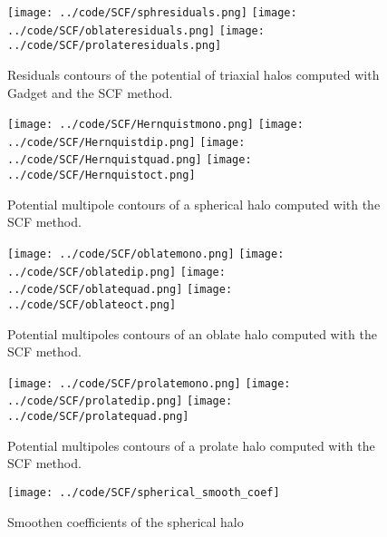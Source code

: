 \documentclass[12pt]{article}
\begin{document}
\begin{figure}[H]
\centering
{}
\texttt{[image: ../code/SCF/sphresiduals.png]}
\endminipage
{}
\texttt{[image: ../code/SCF/oblateresiduals.png]}
\endminipage
{}
\texttt{[image: ../code/SCF/prolateresiduals.png]}
\endminipage
\caption{Residuals contours of the potential of triaxial halos
computed with Gadget and the SCF method.
\label{fig:coeffMW}}
\end{figure}

\begin{figure}[H]
\centering
{}
\texttt{[image: ../code/SCF/Hernquistmono.png]}
\endminipage
{}
\texttt{[image: ../code/SCF/Hernquistdip.png]}
\endminipage
{}
\texttt{[image: ../code/SCF/Hernquistquad.png]}
\endminipage
{}
\texttt{[image: ../code/SCF/Hernquistoct.png]}
\endminipage
\caption{Potential multipole contours of a spherical halo
computed with the SCF method.\label{fig:coeffMW}}
\end{figure}


\begin{figure}[H]
\centering
{}
\texttt{[image: ../code/SCF/oblatemono.png]}
\endminipage
{}
\texttt{[image: ../code/SCF/oblatedip.png]}
\endminipage
{}
\texttt{[image: ../code/SCF/oblatequad.png]}
\endminipage
{}
\texttt{[image: ../code/SCF/oblateoct.png]}
\endminipage
\caption{Potential multipoles contours of an oblate halo
computed with the SCF method.\label{fig:coeffMW}}
\end{figure}



\begin{figure}[H]
\centering
{}
\texttt{[image: ../code/SCF/prolatemono.png]}
\endminipage
{}
\texttt{[image: ../code/SCF/prolatedip.png]}
\endminipage
{}
\texttt{[image: ../code/SCF/prolatequad.png]}
\endminipage
\caption{Potential multipoles contours of a prolate halo
computed with the SCF method.\label{fig:coeffMW}}
\end{figure}

\begin{figure}[H]
\centering
\texttt{[image: ../code/SCF/spherical\_smooth\_coef]}
\caption{Smoothen coefficients of the spherical halo}
\end{figure}
\end{document}
